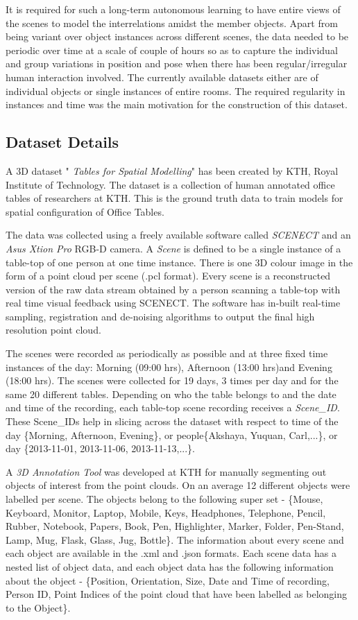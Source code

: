 \documentclass[letterpaper]{article}
\begin{document}
It is required for such a long-term autonomous learning to have entire views of the scenes to model the interrelations amidst the member objects. Apart from being variant over object instances across different scenes, the data needed to be periodic over time at a scale of couple of hours so as to capture the individual and group variations in position and pose when there has been regular/irregular human interaction involved. The currently available datasets either are of individual objects or single instances of entire rooms. The required regularity in instances and time was the main motivation for the construction of this dataset.

\subsection{Dataset Details}
A 3D dataset " \textit{Tables for Spatial Modelling}" has been created by KTH, Royal Institute of Technology. The dataset is a collection of human annotated office tables of researchers at KTH. This is the ground truth data to train models for spatial configuration of Office Tables.

The data was collected using a freely available software called \textit{SCENECT} \cite{} and an \textit{Asus Xtion Pro} RGB-D camera. A \textit{Scene} is defined to be a single instance of a table-top of one person at one time instance. There is one 3D colour image in the form of a point cloud per scene (.pcl format). Every scene is a reconstructed version of the raw data stream obtained by a person scanning a table-top with real time visual feedback using SCENECT. The software has in-built real-time sampling, registration and de-noising algorithms to output the final high resolution point cloud.

The scenes were recorded as periodically as possible and at three fixed time instances of the day: Morning (09:00 hrs), Afternoon (13:00 hrs)and Evening (18:00 hrs). The scenes were collected for 19 days, 3 times per day and for the same 20 different tables. Depending on who the table belongs to and the date and time of the recording, each table-top scene recording receives a \textit{Scene\_ID}. These Scene\_IDs help in slicing across the dataset with respect to time of the day \{Morning, Afternoon, Evening\}, or people\{Akshaya, Yuquan, Carl,...\}, or day \{2013-11-01, 2013-11-06, 2013-11-13,...\}.

A \textit{3D Annotation Tool} was developed at KTH for manually segmenting out objects of interest from the point clouds. On an average 12 different objects were labelled per scene. The objects belong to the following super set - \{Mouse, Keyboard, Monitor, Laptop, Mobile, Keys, Headphones, Telephone, Pencil, Rubber, Notebook, Papers,  Book, Pen, Highlighter, Marker, Folder, Pen-Stand, Lamp, Mug, Flask, Glass, Jug, Bottle\}. The information about every scene and each object are available in the .xml and .json formats. Each scene data has a nested list of object data, and each object data has the following information about the object - \{Position, Orientation, Size, Date and Time of recording, Person ID, Point Indices of the point cloud that have been labelled as belonging to the Object\}.
\end{document}
